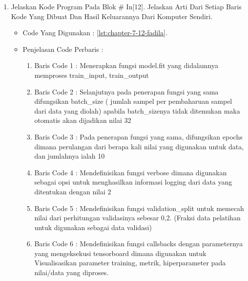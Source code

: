 \begin{enumerate}
\begin{itemize}
\item Hasil : \ref{chapter-7-in-11-fadila}
\par
\par
\begin{figure}[!hbtp]
\centering
\texttt{[image: figures/chapter-7-in-11-fadila.jpg]}
\caption{Code Program Pada In [11] - fadila}
\label{chapter-7-in-11-fadila}
\end{figure}
\par
\par
\end{itemize}
\par
\par
\par
\item Jelaskan Kode Program Pada Blok \# In[12]. Jelaskan Arti Dari Setiap Baris Kode Yang Dibuat Dan Hasil Keluarannya Dari Komputer Sendiri.
\begin{itemize}
\item Code Yang Digunakan : \ref{lst:chapter-7-12-fadila}.

\par
\par
\item Penjelasan Code Perbaris	: 
\begin{enumerate}
\item Baris Code 1	: Menerapkan fungsi model.fit yang didalamnya memproses train\_input, train\_output
\item Baris Code 2	: Selanjutnya pada penerapan fungsi yang sama difungsikan batch\_size ( jumlah sampel per pembaharuan sampel dari data yang diolah) apabila batch\_sizenya tidak ditemukan maka otomatis akan dijadikan nilai 32
\item Baris Code 3	: Pada penerapan fungsi yang sama, difungsikan epochs dimana perulangan dari berapa kali nilai yang digunakan untuk data, dan jumlahnya ialah 10
\item Baris Code 4	: Mendefinisikan fungsi verbose dimana digunakan sebagai opsi untuk menghasilkan informasi logging dari data yang ditentukan dengan nilai 2
\item Baris Code 5	: Mendefinisikan fungsi validation\_split untuk memecah nilai dari perhitungan validasinya sebesar 0,2. (Fraksi data pelatihan untuk digunakan sebagai data validasi)
\item Baris Code 6	: Mendefinisikan fungsi callsbacks dengan parameternya yang mengeksekusi tensorboard dimana digunakan untuk Visualisasikan parameter training, metrik, hiperparameter pada nilai/data yang diproses.

\end{enumerate}
\end{itemize}
\end{enumerate}
